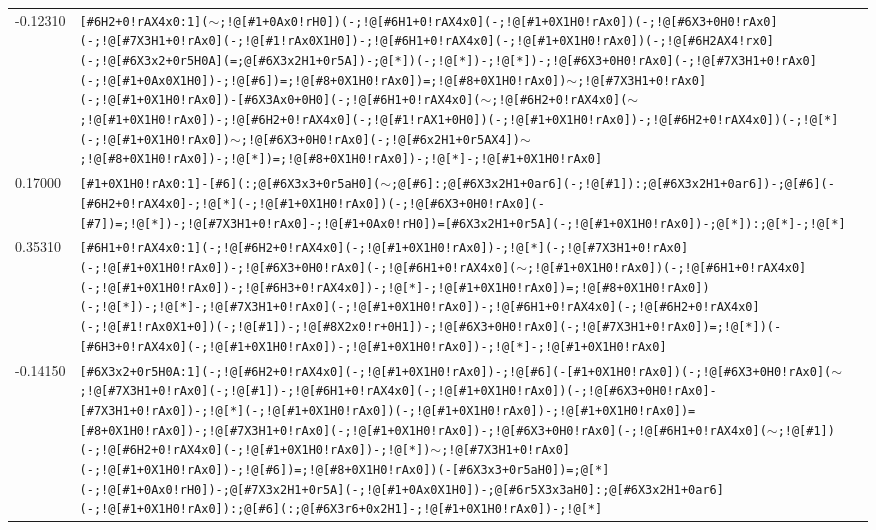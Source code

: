 \begin{longtable}{>{\baselineskip=10pt}p{} >{\baselineskip=10pt}p{}}
-0.12310 & \texttt{[\#6H2+0!rAX4x0:1]($\sim$;!@[\#1+0Ax0!rH0])(-;!@[\#6H1+0!rAX4x0](-;!@[\#1+0X1H0!rAx0])(-;!@[\#6X3+0H0!rAx0](-;!@[\#7X3H1+0!rAx0](-;!@[\#1!rAx0X1H0])-;!@[\#6H1+0!rAX4x0](-;!@[\#1+0X1H0!rAx0])(-;!@[\#6H2AX4!rx0](-;!@[\#6X3x2+0r5H0A](=;@[\#6X3x2H1+0r5A])-;@[*])(-;!@[*])-;!@[*])-;!@[\#6X3+0H0!rAx0](-;!@[\#7X3H1+0!rAx0](-;!@[\#1+0Ax0X1H0])-;!@[\#6])=;!@[\#8+0X1H0!rAx0])=;!@[\#8+0X1H0!rAx0])$\sim$;!@[\#7X3H1+0!rAx0](-;!@[\#1+0X1H0!rAx0])-[\#6X3Ax0+0H0](-;!@[\#6H1+0!rAX4x0]($\sim$;!@[\#6H2+0!rAX4x0]($\sim$;!@[\#1+0X1H0!rAx0])-;!@[\#6H2+0!rAX4x0](-;!@[\#1!rAX1+0H0])(-;!@[\#1+0X1H0!rAx0])-;!@[\#6H2+0!rAX4x0])(-;!@[*](-;!@[\#1+0X1H0!rAx0])$\sim$;!@[\#6X3+0H0!rAx0](-;!@[\#6x2H1+0r5AX4])$\sim$;!@[\#8+0X1H0!rAx0])-;!@[*])=;!@[\#8+0X1H0!rAx0])-;!@[*]-;!@[\#1+0X1H0!rAx0]} \\ 
0.17000 & \texttt{[\#1+0X1H0!rAx0:1]-[\#6](:;@[\#6X3x3+0r5aH0]($\sim$;@[\#6]:;@[\#6X3x2H1+0ar6](-;!@[\#1]):;@[\#6X3x2H1+0ar6])-;@[\#6](-[\#6H2+0!rAX4x0]-;!@[*](-;!@[\#1+0X1H0!rAx0])(-;!@[\#6X3+0H0!rAx0](-[\#7])=;!@[*])-;!@[\#7X3H1+0!rAx0]-;!@[\#1+0Ax0!rH0])=[\#6X3x2H1+0r5A](-;!@[\#1+0X1H0!rAx0])-;@[*]):;@[*]-;!@[*]} \\ 
0.35310 & \texttt{[\#6H1+0!rAX4x0:1](-;!@[\#6H2+0!rAX4x0](-;!@[\#1+0X1H0!rAx0])-;!@[*](-;!@[\#7X3H1+0!rAx0](-;!@[\#1+0X1H0!rAx0])-;!@[\#6X3+0H0!rAx0](-;!@[\#6H1+0!rAX4x0]($\sim$;!@[\#1+0X1H0!rAx0])(-;!@[\#6H1+0!rAX4x0](-;!@[\#1+0X1H0!rAx0])-;!@[\#6H3+0!rAX4x0])-;!@[*]-;!@[\#1+0X1H0!rAx0])=;!@[\#8+0X1H0!rAx0])(-;!@[*])-;!@[*]-;!@[\#7X3H1+0!rAx0](-;!@[\#1+0X1H0!rAx0])-;!@[\#6H1+0!rAX4x0](-;!@[\#6H2+0!rAX4x0](-;!@[\#1!rAx0X1+0])(-;!@[\#1])-;!@[\#8X2x0!r+0H1])-;!@[\#6X3+0H0!rAx0](-;!@[\#7X3H1+0!rAx0])=;!@[*])(-[\#6H3+0!rAX4x0](-;!@[\#1+0X1H0!rAx0])-;!@[\#1+0X1H0!rAx0])-;!@[*]-;!@[\#1+0X1H0!rAx0]} \\ 
-0.14150 & \texttt{[\#6X3x2+0r5H0A:1](-;!@[\#6H2+0!rAX4x0](-;!@[\#1+0X1H0!rAx0])-;!@[\#6](-[\#1+0X1H0!rAx0])(-;!@[\#6X3+0H0!rAx0]($\sim$;!@[\#7X3H1+0!rAx0](-;!@[\#1])-;!@[\#6H1+0!rAX4x0](-;!@[\#1+0X1H0!rAx0])(-;!@[\#6X3+0H0!rAx0]-[\#7X3H1+0!rAx0])-;!@[*](-;!@[\#1+0X1H0!rAx0])(-;!@[\#1+0X1H0!rAx0])-;!@[\#1+0X1H0!rAx0])=[\#8+0X1H0!rAx0])-;!@[\#7X3H1+0!rAx0](-;!@[\#1+0X1H0!rAx0])-;!@[\#6X3+0H0!rAx0](-;!@[\#6H1+0!rAX4x0]($\sim$;!@[\#1])(-;!@[\#6H2+0!rAX4x0](-;!@[\#1+0X1H0!rAx0])-;!@[*])$\sim$;!@[\#7X3H1+0!rAx0](-;!@[\#1+0X1H0!rAx0])-;!@[\#6])=;!@[\#8+0X1H0!rAx0])(-[\#6X3x3+0r5aH0])=;@[*](-;!@[\#1+0Ax0!rH0])-;@[\#7X3x2H1+0r5A](-;!@[\#1+0Ax0X1H0])-;@[\#6r5X3x3aH0]:;@[\#6X3x2H1+0ar6](-;!@[\#1+0X1H0!rAx0]):;@[\#6](:;@[\#6X3r6+0x2H1]-;!@[\#1+0X1H0!rAx0])-;!@[*]} \\ 

\end{longtable}
